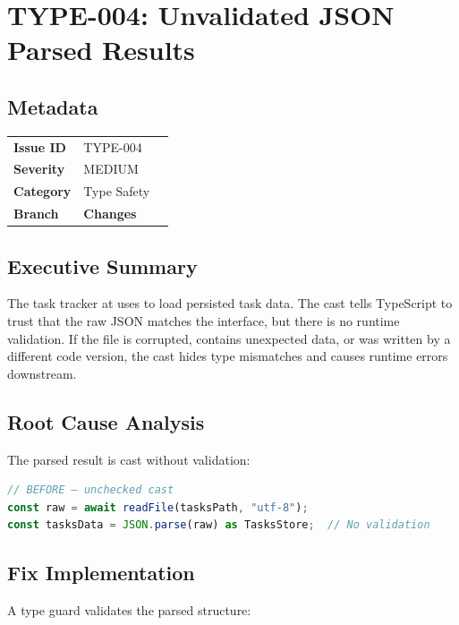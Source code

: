 \section{TYPE-004: Unvalidated JSON Parsed Results}
\label{sec:type-004}
\subsection*{Metadata}
\begin{tabular}{ll}
\textbf{Issue ID} & TYPE-004 \\
\textbf{Severity} & MEDIUM \\
\textbf{Category} & Type Safety \\
\textbf{Branch} & 
\textbf{Changes} &  \\
\end{tabular}

\subsection*{Executive Summary}
The task tracker at  uses  to load persisted task data. The  cast tells TypeScript to trust that the raw JSON matches the  interface, but there is no runtime validation. If the file is corrupted, contains unexpected data, or was written by a different code version, the cast hides type mismatches and causes runtime errors downstream.

\subsection*{Root Cause Analysis}
The parsed result is cast without validation:

\begin{lstlisting}[language=TypeScript]
// BEFORE — unchecked cast
const raw = await readFile(tasksPath, "utf-8");
const tasksData = JSON.parse(raw) as TasksStore;  // No validation
\end{lstlisting}

\subsection*{Fix Implementation}
A type guard validates the parsed structure:

